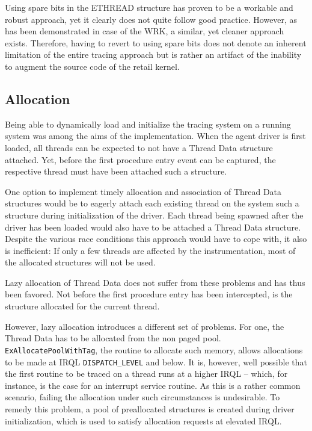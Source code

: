 Using spare bits in the ETHREAD structure has proven to be a workable and
robust approach, yet it clearly does not quite follow good practice. However, as
has been demonstrated in case of the WRK, a similar, yet cleaner approach 
exists. Therefore, having to revert to using spare bits does not
denote an inherent limitation of the entire tracing approach but is rather
an artifact of the inability to augment the source code of the retail kernel.

\subsection{Allocation}
Being able to dynamically load and initialize the tracing system on a running
system was among the aims of the implementation. When the agent driver is first loaded,
all threads can be expected to not have a Thread Data structure attached. Yet,
before the first procedure entry event can be captured, the respective thread
must have been attached such a structure.

One option to implement timely allocation and association of Thread Data 
structures would be to eagerly attach each existing thread
on the system such a structure during initialization of the driver. Each thread
being spawned after the driver has been loaded would also have to be attached
a Thread Data structure. Despite the various race conditions this approach would
have to cope with, it also is inefficient: If only a few threads are affected by 
the instrumentation, most of the allocated structures will not be used.

Lazy allocation of Thread Data does not suffer from these problems and has thus
been favored. Not before the first procedure entry has been intercepted, is 
the structure allocated for the current thread.

However, lazy allocation introduces a different set of problems. For one, the
Thread Data has to be allocated from the non paged pool. \verb|ExAllocatePoolWithTag|,
the routine to allocate such memory, allows allocations to be made at 
IRQL \verb|DISPATCH_LEVEL| and below. It is, however, well possible that the first routine
to be traced on a thread runs at a higher IRQL -- which, for instance,
is the case for an interrupt service routine. As this is a rather common scenario, failing
the allocation under such circumstances is undesirable. To remedy this problem, 
a pool of preallocated structures is created during driver initialization,
which is used to satisfy allocation requests at elevated IRQL.

